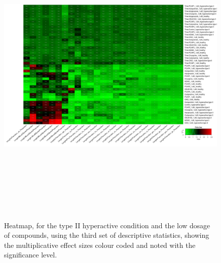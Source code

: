 \documentclass[a4paper,12pt]{article}
\begin{document}
\begin{figure}[h!]
\begin{center}
\includegraphics[width=16cm,height=15cm]{DarkPTZ_heatmap_1_microM_DarkPTZ_B1MAP.png}
\caption{Heatmap, for the type II hyperactive condition and the low dosage of compounds, using the third set of descriptive statistics, showing the multiplicative effect sizes colour coded and noted with the significance level.}
\end{center}
\end{figure}
\newpage
\end{document}

